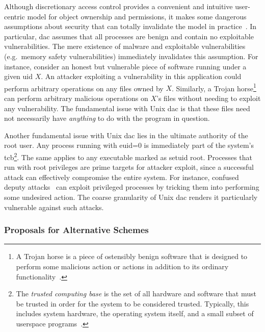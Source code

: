 \documentclass[
  fontsize=12pt,
  titlepage=firstiscover,
  paper=letter,
oneside,
  cleardoublepage=plain,
  parskip=half-,
  DIV=10,
  parindent,
  appendixprefix,
  chapterprefix,
  listof=totoc,
]{scrbook}
\begin{document}
Although discretionary access control provides a convenient and intuitive user-centric
model for object ownership and permissions, it makes some dangerous assumptions about
security that can totally invalidate the model in
practice~\cite{shu2016_security_isolation_study}. In particular, \gls{dac} assumes that all
processes are benign and contain no exploitable vulnerabilities. The mere existence of
malware and exploitable vulnerabilities (e.g.\ memory safety vulnerabilities) immediately
invalidates this assumption. For instance, consider an honest but vulnerable piece of
software running under a given \gls{uid} $X$. An attacker exploiting a vulnerability in
this application could perform arbitrary operations on any files owned by $X$. Similarly,
a Trojan horse\footnote{A Trojan horse is a piece of ostensibly benign software that
is designed to perform some malicious action or actions in addition to its ordinary
functionality~\cite{van_oorschot2020_tools_jewels}.}~\cite{shu2016_security_isolation_study,
van_oorschot2020_tools_jewels} can perform arbitrary malicious operations on $X$'s files
without needing to exploit any vulnerability. The fundamental issue with Unix \gls{dac} is
that these files need not necessarily have \textit{anything} to do with the program in
question.

Another fundamental issue with Unix \gls{dac} lies in the ultimate authority of the root
user. Any process running with \gls{euid}=0 is immediately part of the system's
\gls{tcb}\footnote{The \textit{trusted computing base} is the set of all hardware
and software that must be trusted in order for the system to be considered trusted.
Typically, this includes system hardware, the operating system itself, and a small subset
of userspace programs~\cite{jaeger2008_os_security}.}. The same applies to any executable
marked as setuid root. Processes that run with root privileges are prime targets for
attacker exploit, since a successful attack can effectively compromise the entire system.
For instance, confused deputy attacks~\cite{hardy1988_confused_deputy,
shu2016_security_isolation_study} can exploit privileged processes by tricking them into
performing some undesired action. The coarse granularity of Unix \gls{dac} renders it
particularly vulnerable against such attacks.

\subsubsection*{Proposals for Alternative Schemes}
\end{document}
